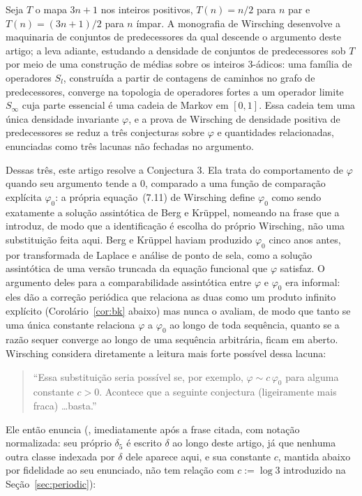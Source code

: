 \documentclass[11pt]{amsart}
\theoremstyle{plain}
\theoremstyle{definition}
\theoremstyle{remark}
\begin{document}
Seja $T$ o mapa $3n+1$ nos inteiros positivos, $T(n) = n/2$ para $n$ par e $T(n) = (3n+1)/2$ para
$n$ ímpar. A monografia de Wirsching \cite{wirsching1998} desenvolve a maquinaria de conjuntos de
predecessores da qual descende o argumento deste artigo; \cite{wirsching2003} a leva adiante,
estudando a densidade de conjuntos de predecessores sob $T$ por meio de uma construção de
médias sobre os inteiros $3$-ádicos: uma família de operadores $S_l$, construída a partir de
contagens de caminhos no grafo de predecessores, converge na topologia de operadores fortes a um
operador limite $S_\infty$ cuja parte essencial é uma cadeia de Markov em $[0,1]$. Essa cadeia tem
uma única densidade invariante $\varphi$, e a prova de Wirsching de densidade positiva de
predecessores se reduz a três conjecturas sobre $\varphi$ e quantidades relacionadas, enunciadas
como três lacunas não fechadas no argumento.

Dessas três, este artigo resolve a Conjectura 3. Ela trata do comportamento de $\varphi$ quando seu
argumento tende a $0$, comparado a uma função de comparação explícita $\varphi_0$: a própria
equação~(7.11) de Wirsching define $\varphi_0$ como sendo exatamente a solução assintótica de Berg e
Kr\"uppel, nomeando \cite{bergkruppel1998} na frase que a introduz, de modo que a identificação é
escolha do próprio Wirsching, não uma substituição feita aqui. Berg e Kr\"uppel haviam produzido
$\varphi_0$ cinco anos antes, por transformada de Laplace e análise de ponto de sela, como a solução
assintótica de uma versão truncada da equação funcional que $\varphi$ satisfaz. O argumento deles
para a comparabilidade assintótica entre $\varphi$ e $\varphi_0$ era informal: eles dão a correção
periódica que relaciona as duas como um produto infinito explícito (Corolário~\ref{cor:bk} abaixo)
mas nunca o avaliam, de modo que tanto se uma única constante relaciona $\varphi$ a $\varphi_0$ ao
longo de toda sequência, quanto se a razão sequer converge ao longo de uma sequência arbitrária,
ficam em aberto. Wirsching considera diretamente a leitura mais forte possível dessa lacuna:

\begin{quote}
``Essa substituição seria possível se, por exemplo, $\varphi \sim c\,\varphi_0$ para alguma
constante $c > 0$. Acontece que a seguinte conjectura (ligeiramente mais fraca) \dots basta.''
\end{quote}

Ele então enuncia (\cite{wirsching2003}, imediatamente após a frase citada, com notação
normalizada: seu próprio $\delta_5$ é escrito $\delta$ ao longo deste artigo, já que nenhuma outra
classe indexada por $\delta$ dele aparece aqui, e sua constante $c$, mantida abaixo por fidelidade
ao seu enunciado, não tem relação com $c:=\log3$ introduzido na Seção~\ref{sec:periodic}):
\end{document}
